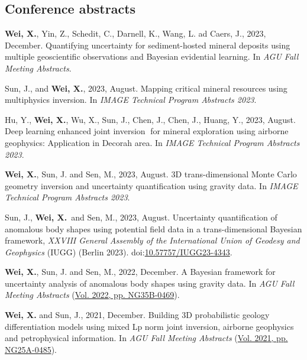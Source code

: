 \documentclass[11pt, a4paper]{article}
\newcommand{\LastName}{Wei}
\newcommand{\Initials}{X}
\newcommand{\Wei}{\textbf{\LastName, \Initials.}}  %
\newcommand{\WeiSun}{\textbf{\LastName, \Initials.} and Sun, J.}  %
\newcommand{\DOI}[1]{doi:\href{https://doi.org/#1}{#1}}
\begin{document}
\subsection*{Conference abstracts}
\begin{etaremune}
	\item 
	\Wei, Yin, Z., Schedit, C., Darnell, K., Wang, L. ad Caers, J., 2023, December. Quantifying uncertainty for sediment-hosted mineral deposits using multiple geoscientific observations and Bayesian evidential learning. In \emph{AGU Fall Meeting Abstracts}.
	
	\item
	Sun, J., and \Wei, 2023, August. Mapping critical mineral resources using multiphysics inversion. In \emph{IMAGE Technical Program Abstracts 2023}. 
	
	\item
	Hu, Y., \Wei, Wu, X., Sun, J., Chen, J., Chen, J., Huang, Y., 2023, August. Deep learning enhanced joint inversion for mineral exploration using airborne geophysics: Application in Decorah area. In \emph{IMAGE Technical Program Abstracts 2023}.
	
	\item
	\Wei, Sun, J. and Sen, M., 2023, August. 3D trans-dimensional Monte Carlo geometry inversion and uncertainty quantification using gravity data. In \emph{IMAGE Technical Program Abstracts 2023}. 
	
	\item
	Sun, J., \Wei \, and Sen, M., 2023, August. Uncertainty quantification of anomalous body shapes using potential field data in a trans-dimensional Bayesian framework, \emph{XXVIII General Assembly of the International Union of Geodesy and Geophysics} (IUGG) (Berlin 2023).  \DOI{10.57757/IUGG23-4343}.
	
	\item
	\Wei, Sun, J. and Sen, M., 2022, December. A Bayesian framework for uncertainty analysis of anomalous body shapes using gravity data. In \emph{AGU Fall Meeting Abstracts} (\href{https://ui.adsabs.harvard.edu/abs/2022AGUFMNG35B0469W/abstract}{Vol. 2022, pp. NG35B-0469}).

	\item
	\WeiSun, 2021, December. Building 3D probabilistic geology differentiation models using mixed Lp norm joint inversion, airborne geophysics and petrophysical information. In \emph{AGU Fall Meeting Abstracts} (\href{https://ui.adsabs.harvard.edu/abs/2021AGUFMNG25A0485W/abstract}{Vol. 2021, pp. NG25A-0485}).


\end{etaremune}
\end{document}
